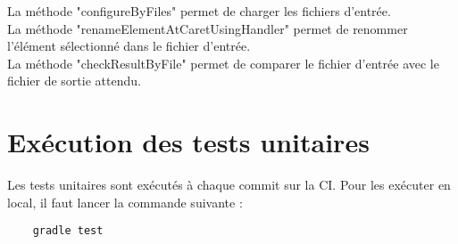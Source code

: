 \noindent La méthode "configureByFiles" permet de charger les fichiers d'entrée.
\\ La méthode "renameElementAtCaretUsingHandler" permet de renommer l'élément sélectionné dans le fichier d'entrée.
\\ La méthode "checkResultByFile" permet de comparer le fichier d'entrée avec le fichier de sortie attendu.

\section{Exécution des tests unitaires}

\noindent Les tests unitaires sont exécutés à chaque commit sur la CI.
\newdoubleline Pour les exécuter en local, il faut lancer la commande suivante :
\begin{lstlisting}
    gradle test
\end{lstlisting}

